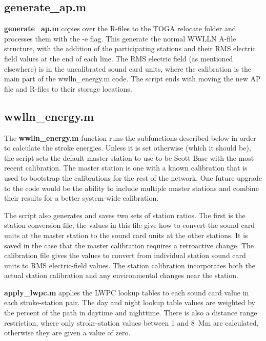 \subsection{generate\_ap.m}

{\bf generate\_ap.m} copies over the R-files to the TOGA relocate folder and processes them with the -e flag.
This generate the normal WWLLN A-file structure, with the addition of the participating stations and their RMS electric field values at the end of each line.
The RMS electric field (as mentioned elsewhere) is in the uncalibrated sound card units, where the calibration is the main part of the wwlln\_energy.m code.
The script ends with moving the new AP file and R-files to their storage locations.

\subsection{wwlln\_energy.m}

The {\bf wwlln\_energy.m} function runs the subfunctions described below in order to calculate the stroke energies.
Unless it is set otherwise (which it should be), the script sets the default master station to use to be Scott Base with the most recent calibration.
The master station is one with a known calibration that is used to bootstrap the calibrations for the rest of the network.
One future upgrade to the code would be the ability to include multiple master stations and combine their results for a better system-wide calibration.

The script also generates and saves two sets of station ratios.
The first is the station conversion file, the values in this file give how to convert the sound card units at the master station to the sound card units at the other stations.
It is saved in the case that the master calibration requires a retroactive change.
The calibration file gives the values to convert from individual station sound card units to RMS electric-field values.
The station calibration incorporates both the actual station calibration and any environmental changes near the station.

{\bf apply\_lwpc.m} applies the LWPC lookup tables to each sound card value in each stroke-station pair.
The day and night lookup table values are weighted by the percent of the path in daytime and nighttime.
There is also a distance range restriction, where only stroke-station values between 1 and 8~Mm are calculated, otherwise they are given a value of zero.

